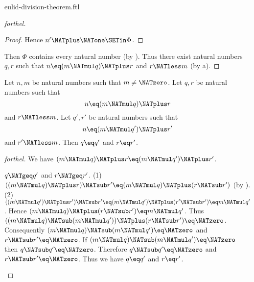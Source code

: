 \documentclass{naproche-library}
\begin{document}
\begin{smodule}[title=Euclid's Division Theorem]{eulid-division-theorem.ftl}
\begin{proof}[forthel]
\begin{proof}
    Hence $n' \NATplus \NATone \SETin \Phi$.
  \end{proof}

  Then $\Phi$ contains every natural number (by ).
  Thus there exist natural numbers $q, r$ such that $n \eq (m \NATmul q) \NATplus r$ and $r \NATless m$ (by a).
\end{proof}

\begin{theorem}[forthel,title=Euclid's Division Theorem: Uniqueness,id=euclid_uniqueness]
  Let $n, m$ be natural numbers such that $m \neq \NATzero$.
  Let $q, r$ be natural numbers such that
  \[n \eq (m \NATmul q) \NATplus r\]
  and $r \NATless m$.
  Let $q', r'$ be natural numbers such that
  \[n \eq (m \NATmul q') \NATplus r'\]
  and $r' \NATless m$.
  Then $q \eq q'$ and $r \eq r'$.
\end{theorem}
\begin{proof}[forthel]
  We have $(m \NATmul q) \NATplus r \eq (m \NATmul q') \NATplus r'$.

  \begin{case}{$q \NATgeq q'$ and $r \NATgeq r'$.}
    (1) $((m \NATmul q) \NATplus r) \NATsub r' \eq (m \NATmul q) \NATplus (r \NATsub r')$ (by ).
    (2) $((m \NATmul q') \NATplus r') \NATsub r'
      \eq (m \NATmul q') \NATplus (r' \NATsub r')
      \eq m \NATmul q'$.
    Hence $(m \NATmul q) \NATplus (r \NATsub r') \eq m \NATmul q'$.
    Thus $((m \NATmul q) \NATsub (m \NATmul q')) \NATplus (r \NATsub r') \eq \NATzero$.
    Consequently $(m \NATmul q) \NATsub (m \NATmul q') \eq \NATzero$ and $r \NATsub r' \eq \NATzero$.
    If $(m \NATmul q) \NATsub (m \NATmul q') \eq \NATzero$ then $q \NATsub q' \eq \NATzero$.
    Therefore $q \NATsub q' \eq \NATzero$ and $r \NATsub r' \eq \NATzero$.
    Thus we have $q \eq q'$ and $r \eq r'$.
  \end{case}


\end{proof}
\end{smodule}
\end{document}
